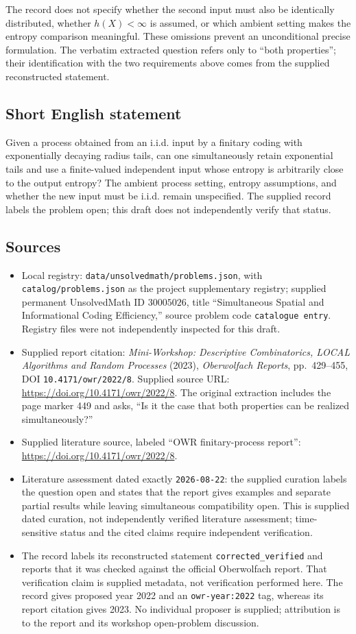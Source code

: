 \documentclass[11pt]{article}
\begin{document}
The record does not specify whether the second input must also be identically distributed, whether \(h(X)<\infty\) is assumed, or which ambient setting makes the entropy comparison meaningful. These omissions prevent an unconditional precise formulation. The verbatim extracted question refers only to ``both properties''; their identification with the two requirements above comes from the supplied reconstructed statement.
\subsection{Short English statement}
Given a process obtained from an i.i.d. input by a finitary coding with exponentially decaying radius tails, can one simultaneously retain exponential tails and use a finite-valued independent input whose entropy is arbitrarily close to the output entropy? The ambient process setting, entropy assumptions, and whether the new input must be i.i.d. remain unspecified. The supplied record labels the problem open; this draft does not independently verify that status.
\subsection{Sources}
\begin{itemize}
\item Local registry: \texttt{data/unsolvedmath/problems.json}, with \texttt{catalog/problems.json} as the project supplementary registry; supplied permanent UnsolvedMath ID \(30005026\), title ``Simultaneous Spatial and Informational Coding Efficiency,'' source problem code \texttt{catalogue entry}. Registry files were not independently inspected for this draft.
\item Supplied report citation: \emph{Mini-Workshop: Descriptive Combinatorics, LOCAL Algorithms and Random Processes} (2023), \emph{Oberwolfach Reports}, pp.\ 429--455, DOI \texttt{10.4171/owr/2022/8}. Supplied source URL: \url{https://doi.org/10.4171/owr/2022/8}. The original extraction includes the page marker 449 and asks, ``Is it the case that both properties can be realized simultaneously?''
\item Supplied literature source, labeled ``OWR finitary-process report'': \url{https://doi.org/10.4171/owr/2022/8}.
\item Literature assessment dated exactly \texttt{2026-08-22}: the supplied curation labels the question open and states that the report gives examples and separate partial results while leaving simultaneous compatibility open. This is supplied dated curation, not independently verified literature assessment; time-sensitive status and the cited claims require independent verification.
\item The record labels its reconstructed statement \texttt{corrected\_verified} and reports that it was checked against the official Oberwolfach report. That verification claim is supplied metadata, not verification performed here. The record gives proposed year 2022 and an \texttt{owr-year:2022} tag, whereas its report citation gives 2023. No individual proposer is supplied; attribution is to the report and its workshop open-problem discussion.
\end{itemize}
\end{document}
